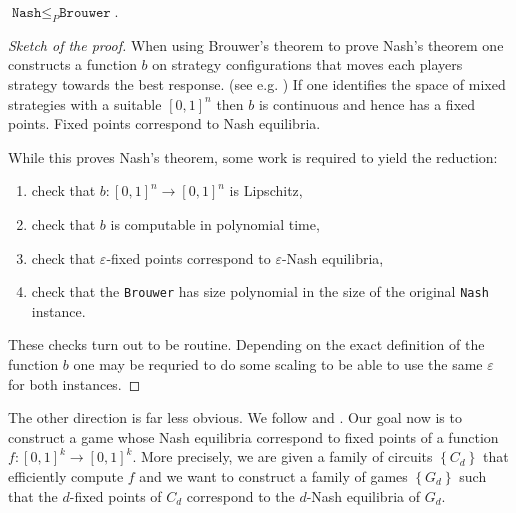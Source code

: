 \documentclass{article}
\begin{document}
\begin{theorem}
  $\texttt{Nash}\leq_P\texttt{Brouwer}$.
  \begin{proof}[Sketch of the proof]
    When using Brouwer's theorem to prove Nash's theorem one
    constructs a function $b$ on strategy configurations that
    moves each players strategy towards the best response.
    (see e.g. \cite{karsten2017})
    If one identifies the space of mixed strategies with a suitable
    $\left[{0,1}\right]^n$ then $b$ is continuous and hence has a
    fixed points. Fixed points correspond to Nash equilibria.

    While this proves Nash's theorem, some work is required to
    yield the reduction:
    \begin{enumerate}
      \item check that $b:\left[{0,1}\right]^n\to\left[{0,1}\right]^n$
        is Lipschitz,
      \item check that $b$ is computable in polynomial time,
      \item check that $\varepsilon$-fixed points correspond to
        $\varepsilon$-Nash equilibria,
      \item check that the \texttt{Brouwer} has size polynomial
        in the size of the original \texttt{Nash} instance.
    \end{enumerate}
    These checks turn out to be routine. Depending on the exact
    definition of the function $b$ one may be requried to do some
    scaling to be able to use the same $\varepsilon$ for both
    instances.
  \end{proof}
\end{theorem}

The other direction is far less obvious. We follow \cite{daskalakis2008}
and \cite{daskalakis2009}. Our goal now is to
construct a game whose Nash equilibria correspond to fixed points of
a function $f:\left[{0,1}\right]^k\to\left[{0,1}\right]^k$.
More precisely, we are given a family of circuits $\left\lbrace{C_d}\right\rbrace$ that efficiently compute $f$ and we want to construct a
family of games $\left\lbrace{G_d}\right\rbrace$ such that
the $d$-fixed points of $C_d$ correspond to the $d$-Nash equilibria of $G_d$.
\end{document}
